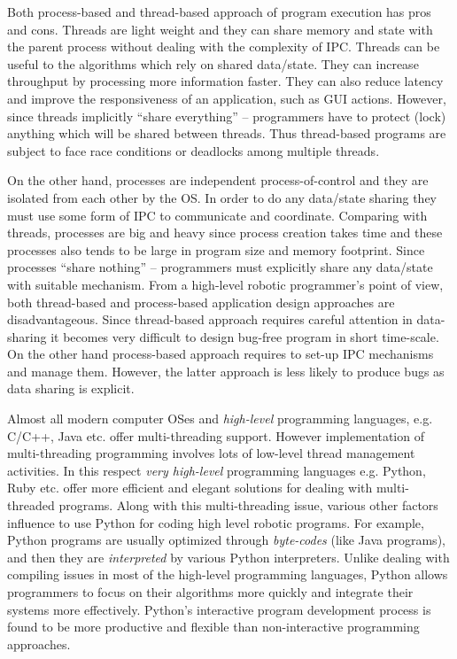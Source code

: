 Both process-based and thread-based approach of  program execution has pros and cons. Threads are light weight and they can share memory and state with the parent process without dealing with the complexity of IPC.   Threads can be useful to the algorithms which rely on shared data/state. They can increase throughput by processing more information faster. They can also reduce latency and improve the responsiveness of an application, such as GUI actions. However, since threads  implicitly ``share everything'' – programmers have to protect (lock) anything which will be
shared between threads. Thus thread-based programs are subject to face race conditions or deadlocks among multiple threads.

On the other hand, processes are independent process-of-control and they are isolated from each other by the OS. In order to do any data/state sharing they must use some form of IPC to communicate and coordinate. Comparing with threads, processes are big and heavy since process creation takes time and these processes also tends to be large in program size and memory footprint.  Since processes ``share nothing'' -- programmers must explicitly share any data/state with suitable mechanism. From a high-level robotic programmer's point of view, both thread-based and process-based application design approaches are disadvantageous. Since thread-based approach requires careful attention in data-sharing it becomes very difficult to design bug-free program in short time-scale. On the other hand process-based approach requires to set-up IPC mechanisms and manage them. However, the latter approach is less likely to produce bugs as data sharing is explicit.
 
Almost all modern computer OSes and {\em high-level} programming languages, e.g. C/C++, Java etc. offer multi-threading support. However implementation of multi-threading programming involves lots of low-level thread management activities. In this respect {\em very high-level} programming languages e.g. Python, Ruby etc. offer more efficient and elegant solutions for dealing with multi-threaded programs. Along with this multi-threading issue, various other factors influence to use Python for coding high level robotic programs. For example, Python programs are  usually optimized through {\em byte-codes} (like Java programs), and then they are {\em interpreted} by various Python interpreters. Unlike dealing with compiling issues in most of the high-level programming languages, Python allows programmers to focus on their  algorithms more quickly and integrate their systems more effectively. Python's interactive program development process is found to be more productive and flexible than non-interactive programming approaches.


